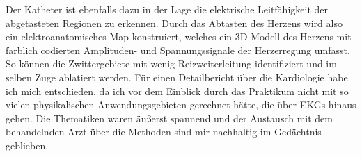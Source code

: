     Der Katheter ist ebenfalls dazu in der Lage die elektrische Leitfähigkeit der abgetasteten Regionen zu erkennen.
    Durch das Abtasten des Herzens wird also ein elektroanatomisches Map konstruiert, welches ein 3D-Modell des Herzens mit farblich codierten Amplituden- und
    Spannungssignale der Herzerregung umfasst.
    So können die Zwittergebiete mit wenig Reizweiterleitung identifiziert und im selben Zuge ablatiert werden.
    Für einen Detailbericht über die Kardiologie habe ich mich entschieden, da ich vor dem Einblick durch das Praktikum nicht mit so vielen
    physikalischen Anwendungsgebieten gerechnet hätte, die über EKGs hinaus gehen.
    Die Thematiken waren äußerst spannend und der Austausch mit dem behandelnden Arzt über die Methoden sind mir nachhaltig im Gedächtnis geblieben.
    


